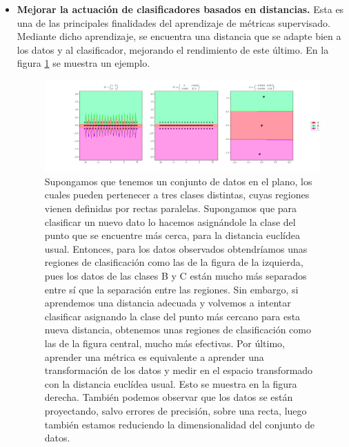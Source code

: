 \begin{itemize}
    \item \textbf{Mejorar la actuación de clasificadores basados en distancias.} Esta es una de las principales finalidades del aprendizaje de métricas supervisado. Mediante dicho aprendizaje, se encuentra una distancia que se adapte bien a los datos y al clasificador, mejorando el rendimiento de este último. En la figura \ref{fig:mejorar_knn} se muestra un ejemplo.

    \begin{figure}[h]
    \centering
    \includegraphics[width=21cm,center]{./images/ex_learning_nca.png}
    \caption{Supongamos que tenemos un conjunto de datos en el plano, los cuales pueden pertenecer a tres clases distintas, cuyas regiones vienen definidas por rectas paralelas. Supongamos que para clasificar un nuevo dato lo hacemos asignándole la clase del punto que se encuentre más cerca, para la distancia euclídea usual. Entonces, para los datos observados obtendríamos unas regiones de clasificación como las de la figura de la izquierda, pues los datos de las clases B y C están mucho más separados entre sí que la separación entre las regiones. Sin embargo, si aprendemos una distancia adecuada y volvemos a intentar clasificar asignando la clase del punto más cercano para esta nueva distancia, obtenemos unas regiones de clasificación como las de la figura central, mucho más efectivas. Por último, aprender una métrica es equivalente a aprender una transformación de los datos y medir en el espacio transformado con la distancia euclídea usual. Esto se muestra en la figura derecha. También podemos observar que los datos se están proyectando, salvo errores de precisión, sobre una recta, luego también estamos reduciendo la dimensionalidad del conjunto de datos.} \label{fig:mejorar_knn}
    \end{figure}
    

\end{itemize}
